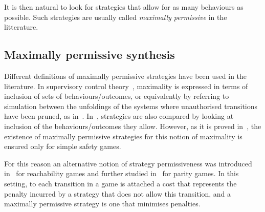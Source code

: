   
It is then natural to look for  strategies that allow for as many
behaviours as possible. Such strategies are usually called
\emph{maximally permissive} in the litterature.



\subsection{Maximally permissive synthesis}
\label{sec-max-perm}

Different definitions of maximally permissive strategies have been used
in the literature. In supervisory control
theory~\cite{ramadge1987supervisory}, maximality is expressed in terms
of inclusion of sets of behaviours/outcomes, or equivalently by
referring to simulation between the unfoldings of the systems where
unauthorised transitions have been pruned, as
in~\cite{pinchinat2005you}.  In~\cite{bernet2002permissive},
strategies are also compared by looking at inclusion of the behaviours/outcomes they allow. However, as it is proved
in~\cite{bernet2002permissive}, the existence of maximally permissive
strategies for this notion of maximality is ensured only for simple
safety games.

For this reason an alternative notion of strategy
permissiveness was introduced in~\cite{bouyer2009measuring} for
reachability games and further studied in~\cite{bouyer2011measuring}
for parity games. In this setting, to each transition in a game is
attached a cost that represents the penalty incurred by a strategy
that does not allow this transition, and a maximally permissive
strategy is one that minimises penalties.

